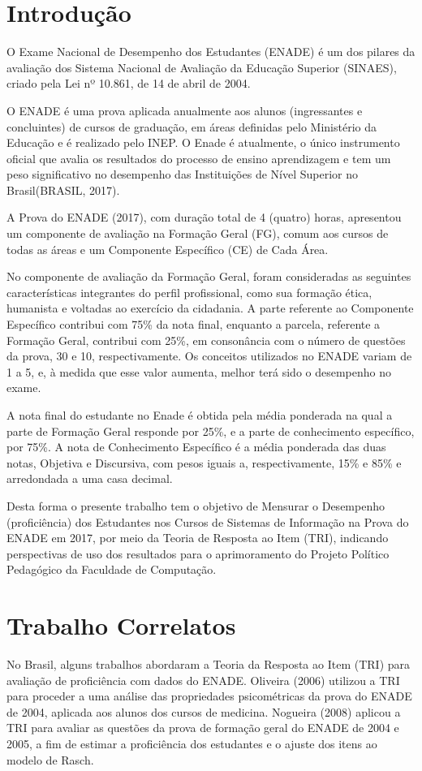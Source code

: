 \documentclass[12pt]{article}
\begin{document}
\newpage
\section{Introdução}

O Exame Nacional de Desempenho dos Estudantes (ENADE) é um dos pilares da avaliação dos Sistema Nacional de Avaliação da Educação Superior (SINAES), criado pela Lei nº 10.861, de 14 de abril de 2004. 

O ENADE é uma prova aplicada anualmente aos alunos (ingressantes e concluintes) de cursos de graduação, em áreas definidas pelo Ministério da Educação e é realizado pelo INEP. O Enade é atualmente, o único instrumento oficial que avalia os resultados do processo de ensino aprendizagem e tem um peso significativo no desempenho das Instituições de Nível Superior no Brasil(BRASIL, 2017).

A Prova do ENADE (2017), com duração total de 4 (quatro) horas, apresentou um componente de avaliação na Formação Geral (FG), comum aos cursos de todas as áreas e um Componente Específico (CE) de Cada Área. 

No componente de avaliação da Formação Geral, foram consideradas as seguintes características integrantes do perfil profissional, como sua formação ética, humanista e voltadas ao exercício da cidadania. A parte referente ao Componente Específico contribui com 75\% da nota final, enquanto a parcela, referente a Formação Geral, contribui com 25\%, em consonância com o número de questões da prova, 30 e 10, respectivamente. Os conceitos utilizados no ENADE variam de 1 a 5, e, à medida que esse valor aumenta, melhor terá sido o desempenho no exame.

A nota final do estudante no Enade é obtida pela média ponderada na qual a parte de Formação Geral responde por 25\%, e a parte de conhecimento específico, por 75\%. A nota de Conhecimento Específico é a média ponderada das duas notas, Objetiva e Discursiva, com pesos iguais a, respectivamente, 15\% e 85\% e arredondada a uma casa decimal.

Desta forma o presente trabalho tem o objetivo de Mensurar o Desempenho (proficiência) dos Estudantes nos Cursos de Sistemas de Informação na Prova do ENADE em 2017, por meio da Teoria de Resposta ao Item (TRI), indicando perspectivas de uso dos resultados para o aprimoramento do Projeto Político Pedagógico da Faculdade de Computação.


\section{Trabalho Correlatos} \label{sec:firstpage}
No Brasil, alguns trabalhos abordaram a Teoria da Resposta ao Item (TRI) para avaliação de proficiência com dados do ENADE. Oliveira (2006) utilizou a TRI para proceder a uma análise das propriedades psicométricas da prova do ENADE de 2004, aplicada aos alunos dos cursos de medicina. Nogueira (2008) aplicou a TRI para avaliar as questões da prova de formação geral do ENADE de 2004 e 2005, a fim de estimar a proficiência dos estudantes e o ajuste dos itens ao modelo de Rasch.
\end{document}
